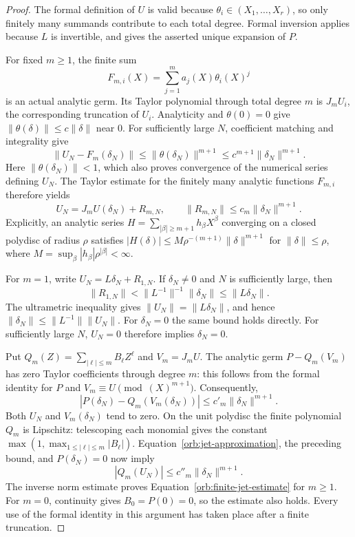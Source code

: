 \begin{proof}
The formal definition of $U$ is valid because
$\theta_i\in(X_1,\ldots,X_r)$, so only finitely many summands contribute
to each total degree.  Formal inversion applies because $L$ is
invertible, and gives the asserted unique expansion of $P$.

For fixed $m\geq1$, the finite sum
\[
 F_{m,i}(X)=\sum_{j=1}^m a_j(X)\theta_i(X)^j
\]
is an actual analytic germ.  Its Taylor polynomial through total degree
$m$ is $J_mU_i$, the corresponding truncation of $U_i$.  Analyticity and
$\theta(0)=0$ give $\|\theta(\delta)\|\leq c\|\delta\|$ near $0$.
For sufficiently large $N$, coefficient matching and integrality give
\[
 \|U_N-F_m(\delta_N)\|
 \leq\|\theta(\delta_N)\|^{m+1}
 \leq c^{m+1}\|\delta_N\|^{m+1}.
\]
Here $\|\theta(\delta_N)\|<1$, which also proves convergence of the
numerical series defining $U_N$.  The Taylor estimate for the finitely
many analytic functions $F_{m,i}$ therefore yields
\begin{equation}\label{orb:jet-approximation}
 U_N=J_mU(\delta_N)+R_{m,N},\qquad
 \|R_{m,N}\|\leq c_m\|\delta_N\|^{m+1}.
\end{equation}
Explicitly, an analytic series $H=\sum_{|\beta|\geq m+1}h_\beta X^\beta$
converging on a closed polydisc of radius $\rho$ satisfies
$|H(\delta)|\leq M\rho^{-(m+1)}\|\delta\|^{m+1}$ for
$\|\delta\|\leq\rho$, where
$M=\sup_\beta |h_\beta|\rho^{|\beta|}<\infty$.

For $m=1$, write $U_N=L\delta_N+R_{1,N}$.  If
$\delta_N\neq0$ and $N$ is sufficiently large, then
\[
 \|R_{1,N}\|<\|L^{-1}\|^{-1}\|\delta_N\|
 \leq\|L\delta_N\|.
\]
The ultrametric inequality gives
$\|U_N\|=\|L\delta_N\|$, and hence
$\|\delta_N\|\leq\|L^{-1}\|\|U_N\|$.
For $\delta_N=0$ the same bound holds directly.  For sufficiently
large $N$, $U_N=0$ therefore implies $\delta_N=0$.

Put $Q_m(Z)=\sum_{|\ell|\leq m}B_\ell Z^\ell$ and $V_m=J_mU$.
The analytic germ $P-Q_m(V_m)$ has zero Taylor coefficients through
degree $m$: this follows from the formal identity for $P$ and
$V_m\equiv U\pmod{(X)^{m+1}}$.  Consequently,
\[
 |P(\delta_N)-Q_m(V_m(\delta_N))|
 \leq c'_m\|\delta_N\|^{m+1}.
\]
Both $U_N$ and $V_m(\delta_N)$ tend to zero.  On the unit polydisc the
finite polynomial $Q_m$ is Lipschitz: telescoping each monomial gives
the constant
$\max(1,\max_{1\leq|\ell|\leq m}|B_\ell|)$.
Equation~\eqref{orb:jet-approximation}, the preceding bound, and
$P(\delta_N)=0$ now imply
\[
 |Q_m(U_N)|\leq c''_m\|\delta_N\|^{m+1}.
\]
The inverse norm estimate proves
Equation~\eqref{orb:finite-jet-estimate} for $m\geq1$.
For $m=0$, continuity gives $B_0=P(0)=0$, so the estimate also holds.
Every use of the formal identity in this argument has taken place
after a finite truncation.
\end{proof}

